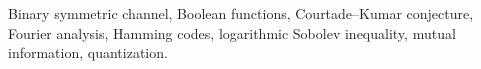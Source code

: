 \documentclass[journal]{IEEEtran}
\theoremstyle{definition}
\theoremstyle{remark}
\begin{document}
\begin{IEEEkeywords}
Binary symmetric channel, Boolean functions, Courtade--Kumar conjecture,
Fourier analysis, Hamming codes, logarithmic Sobolev inequality, mutual
information, quantization.
\end{IEEEkeywords}







\appendices








\end{document}
